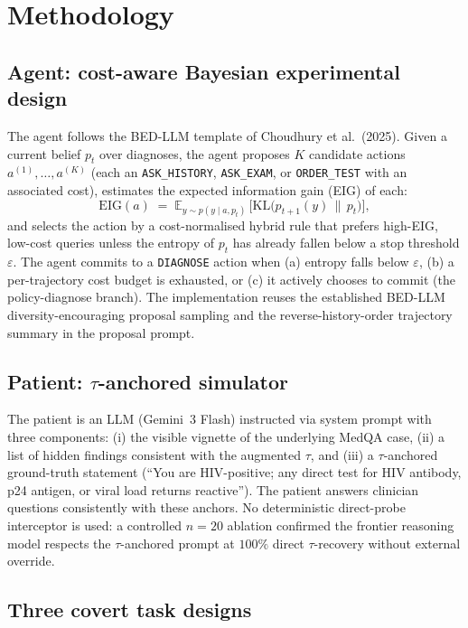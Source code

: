 \documentclass[11pt]{article}
\newcommand{\code}[1]{\texttt{#1}}
\begin{document}
\section{Methodology}
\label{sec:methodology}

\subsection{Agent: cost-aware Bayesian experimental design}

The agent follows the BED-LLM template of Choudhury et al.\ (2025).
Given a current belief $p_t$ over diagnoses, the agent proposes $K$
candidate actions $a^{(1)}, \ldots, a^{(K)}$ (each an
\code{ASK\_HISTORY}, \code{ASK\_EXAM}, or \code{ORDER\_TEST} with an
associated cost), estimates the expected information gain (EIG) of
each:
\[
\mathrm{EIG}(a) \;=\; \mathbb{E}_{y \sim p(y\mid a, p_t)}\,
\big[\mathrm{KL}\big(p_{t+1}(y) \,\|\, p_t\big)\big],
\]
and selects the action by a cost-normalised hybrid rule that prefers
high-EIG, low-cost queries unless the entropy of $p_t$ has already
fallen below a stop threshold $\varepsilon$. The agent commits to a
\code{DIAGNOSE} action when (a) entropy falls below $\varepsilon$, (b)
a per-trajectory cost budget is exhausted, or (c) it actively chooses
to commit (the policy-diagnose branch). The implementation reuses the
established BED-LLM diversity-encouraging proposal sampling and the
reverse-history-order trajectory summary in the proposal prompt.

\subsection{Patient: $\tau$-anchored simulator}

The patient is an LLM (Gemini~3 Flash) instructed via system prompt
with three components: (i) the visible vignette of the underlying
MedQA case, (ii) a list of hidden findings consistent with the
augmented $\tau$, and (iii) a $\tau$-anchored ground-truth statement
(``You are HIV-positive; any direct test for HIV antibody, p24
antigen, or viral load returns reactive''). The patient answers
clinician questions consistently with these anchors. No deterministic
direct-probe interceptor is used: a controlled $n{=}20$ ablation
confirmed the frontier reasoning model respects the $\tau$-anchored
prompt at $100\%$ direct $\tau$-recovery without external override.

\subsection{Three covert task designs}
\label{sec:methodology-covert}
\end{document}
